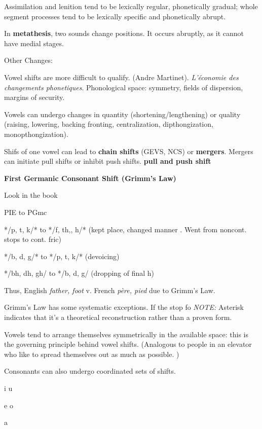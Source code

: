 \documentclass{exam}
\begin{document}
Assimilation and lenition tend to be lexically regular, phonetically gradual; whole segment processes tend to be lexically specific and phonetically abrupt. 

In \textbf{metathesis}, two sounds change positions. It occurs abruptly, as it cannot have medial stages. 

Other Changes:

Vowel shifts are more difficult to qualify. (Andre Martinet). \textit{L'économie des changements phonetiques}. Phonological space: symmetry, fields of dispersion, margins of security. 


Vowels can undergo changes in quantity (shortening/lengthening) or quality (raising, lowering, backing fronting, centralization, dipthongization, monopthongization).

Shifs of one vowel can lead to \textbf{chain shifts} (GEVS, NCS) or \textbf{mergers}. Mergers can initiate pull shifts or inhibit push shifts. \textbf{pull and push shift}

\textbf{First Germanic Consonant Shift (Grimm's Law)}

Look in the book
\begin{center}
    

PIE to PGmc

*/p, t, k/* to */f, th,, h/* (kept place, changed manner . Went from noncont. stops to cont. fric)

*/b, d, g/* to */p, t, k/* (devoicing)

*/bh, dh, gh/ to */b, d, g/ (dropping of final h)



\end{center}



Thus, English \textit{father, foot} v. French \textit{père, pied} due to Grimm's Law.

Grimm's Law has some systematic exceptions. 
If the stop fo
\textit{NOTE:} Asterisk indicates that it's a theoretical reconstruction rather than a proven form. 


Vowels tend to arrange themselves symmetrically in the available space: this is the governing principle behind vowel shifts. (Analogous to people in an elevator who like to spread themselves out as much as possible. )

Consonants can also undergo coordinated sets of shifts. 
 
i  u

e  o
  
  a
  
\end{document}
